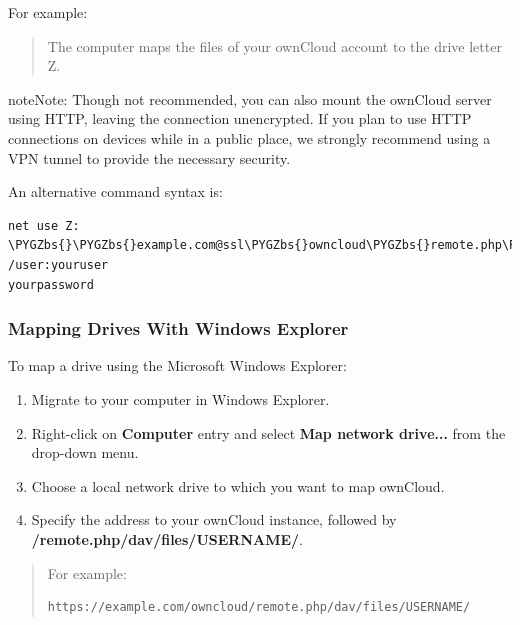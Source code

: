 \documentclass[letterpaper,10pt,english]{sphinxmanual}
\def\PYGZbs{\char`\\}
\begin{document}
For example: 
\begin{quote}

The computer maps the files of your ownCloud account to the drive letter Z.
\end{quote}

\begin{notice}{note}{Note:}
Though not recommended, you can also mount the ownCloud server
using HTTP, leaving the connection unencrypted.  If you plan to use HTTP
connections on devices while in a public place, we strongly recommend using a
VPN tunnel to provide the necessary security.
\end{notice}

An alternative command syntax is:

\begin{Verbatim}[commandchars=\\\{\}]
net use Z: \PYGZbs{}\PYGZbs{}example.com@ssl\PYGZbs{}owncloud\PYGZbs{}remote.php\PYGZbs{}dav /user:youruser
yourpassword
\end{Verbatim}


\subsubsection{Mapping Drives With Windows Explorer}
\label{files/access_webdav:mapping-drives-with-windows-explorer}
To map a drive using the Microsoft Windows Explorer:
\begin{enumerate}
\item {} 
Migrate to your computer in Windows Explorer.

\item {} 
Right-click on \textbf{Computer} entry and select \textbf{Map network drive...} from
the drop-down menu.

\item {} 
Choose a local network drive to which you want to map ownCloud.

\item {} 
Specify the address to your ownCloud instance, followed by
\textbf{/remote.php/dav/files/USERNAME/}.

\end{enumerate}
\begin{quote}

For example:

\begin{Verbatim}[commandchars=\\\{\}]
https://example.com/owncloud/remote.php/dav/files/USERNAME/
\end{Verbatim}
\end{quote}
\end{document}
